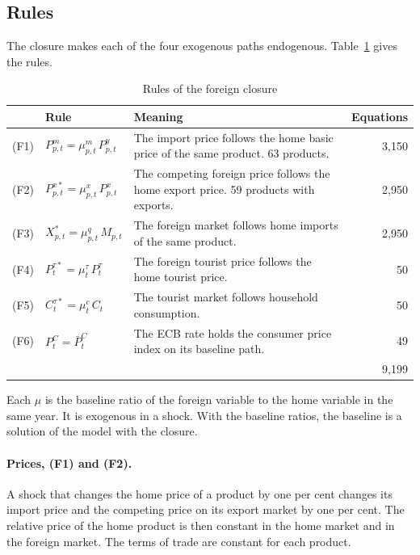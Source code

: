 \documentclass[11pt,a4paper]{article}
\begin{document}
\subsection{Rules}

The closure makes each of the four exogenous paths endogenous. Table~\ref{tab:rules} gives the rules.

\begin{table}[H]
\centering
\small
\caption{Rules of the foreign closure}
\label{tab:rules}
\begin{tabular}{@{}llp{6.2cm}r@{}}
\toprule
 & Rule & Meaning & Equations \\
\midrule
(F1) & $P^{m}_{p,t} = \mu^{m}_{p,t}\, P^{y}_{p,t}$ & The import price follows the home basic price of the same product. 63 products. & 3{,}150 \\[2pt]
(F2) & $P^{x*}_{p,t} = \mu^{x}_{p,t}\, P^{x}_{p,t}$ & The competing foreign price follows the home export price. 59 products with exports. & 2{,}950 \\[2pt]
(F3) & $X^{*}_{p,t} = \mu^{q}_{p,t}\, M_{p,t}$ & The foreign market follows home imports of the same product. & 2{,}950 \\[2pt]
(F4) & $P^{\tau*}_{t} = \mu^{\tau}_{t}\, P^{\tau}_{t}$ & The foreign tourist price follows the home tourist price. & 50 \\[2pt]
(F5) & $C^{\tau*}_{t} = \mu^{c}_{t}\, C_{t}$ & The tourist market follows household consumption. & 50 \\[2pt]
(F6) & $P^{C}_{t} = \bar{P}^{C}_{t}$ & The ECB rate holds the consumer price index on its baseline path. & 49 \\
\midrule
 & & & 9{,}199 \\
\bottomrule
\end{tabular}
\end{table}

Each $\mu$ is the baseline ratio of the foreign variable to the home variable in the same year. It is exogenous in a shock. With the baseline ratios, the baseline is a solution of the model with the closure.

\paragraph{Prices, (F1) and (F2).}
A shock that changes the home price of a product by one per cent changes its import price and the competing price on its export market by one per cent.
The relative price of the home product is then constant in the home market and in the foreign market. The terms of trade are constant for each product.
\end{document}
